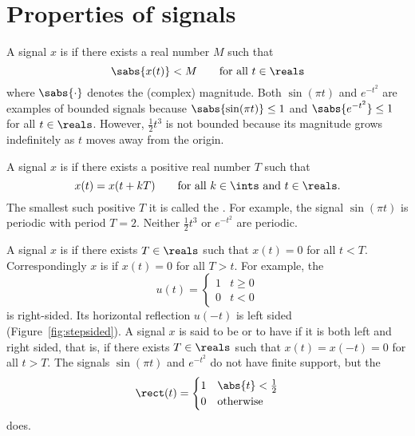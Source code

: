 \section{Properties of signals}\label{sec:properties-signals}


A signal $x$ is  if there exists a real number $M$ such that 
\[
\sabs{x(t)} < M \qquad \text{for all $t \in \reals$} 
\]
where $\sabs{\cdot}$ denotes the (complex) magnitude.  Both $\sin( \pi t)$ and $e^{-t^2}$ are examples of bounded signals because $\sabs{\sin( \pi t)} \leq 1$ and $\sabs{e^{-t^2}} \leq 1$ for all $t \in \reals$.  However, $\frac{1}{2}t^3$ is not bounded because its magnitude grows indefinitely as $t$ moves away from the origin.  %

A signal $x$ is  if there exists a positive real number $T$ such that
\[
x(t) = x(t + kT) \qquad \text{for all $k \in \ints$ and $t \in \reals$.}
\]
The smallest such positive $T$ it is called the .  For example, the signal $\sin( \pi t)$ is periodic with period $T=2$.  Neither $\frac{1}{2}t^3$ or $e^{-t^2}$ are periodic.  %

A signal $x$ is  if there exists $T \in \reals$ such that $x(t) = 0$ for all $t < T$.  Correspondingly $x$ is  if $x(t) = 0$ for all $T > t$.  For example, the  
\begin{equation} \label{eq:stepfunction}
u(t) = \begin{cases}
1 & t \geq 0 \\
0 & t < 0
\end{cases}
\end{equation}
is right-sided.  Its horizontal reflection $u(-t)$ is left sided (Figure~\ref{fig:stepsided}).  A signal $x$ is said to be  or to have  if it is both left and right sided, that is, if there exists $T\in\reals$ such that $x(t) = x(-t) = 0$ for all $t > T$.  The signals $\sin( \pi t)$ and $e^{-t^2}$ do not have finite support, but the 
\begin{equation}\label{eq:rectfuncdefn}
\rect(t) = \begin{cases} 
1 & \abs{t} < \frac{1}{2}\\
0 & \text{otherwise}
\end{cases}
\end{equation}
does.

